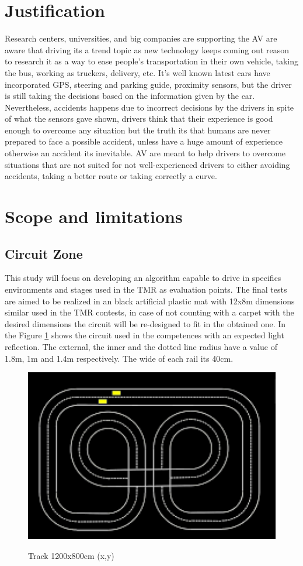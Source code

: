 \section{Justification}
Research centers, universities, and big companies are supporting the AV are aware that driving its a trend topic as new technology keeps coming out reason to research it as a way to ease people's transportation in their own vehicle, taking the bus, working as truckers, delivery, etc. It's well known latest cars have incorporated GPS, steering and parking guide, proximity sensors, but the driver is still taking the decisions based on the information given by the car. Nevertheless, accidents happens due to incorrect decisions by the drivers in spite of what the sensors gave shown, drivers think that their experience is good enough to overcome any situation but the truth its that humans are never prepared to face a possible accident, unless have a huge amount of experience otherwise an accident its inevitable. AV are meant to help drivers to overcome situations that are not suited for not well-experienced drivers to either avoiding accidents, taking a better route or taking correctly a curve. 

\section{Scope and limitations}
    \subsection{Circuit Zone}
    This study will focus on developing an algorithm capable to drive in specifics environments and stages used in the TMR as evaluation points. The final tests are aimed to be realized in an black artificial plastic mat with 12x8m dimensions similar used in the TMR contests, in case of not counting with a carpet with the desired dimensions the circuit will be re-designed to fit in the obtained one. In the Figure \ref{fig:Track} shows the circuit used in the competences with an expected light reflection. The external, the inner and the dotted line radius have a value of 1.8m, 1m and 1.4m respectively. The wide of each rail its 40cm.
    \begin{figure}[h]
        \centering
        \includegraphics[width=12cm]{Figures/pista.png} \\[2mm]
        \caption{Track 1200x800cm (x,y)}
        \label{fig:Track}
    \end{figure}
    
